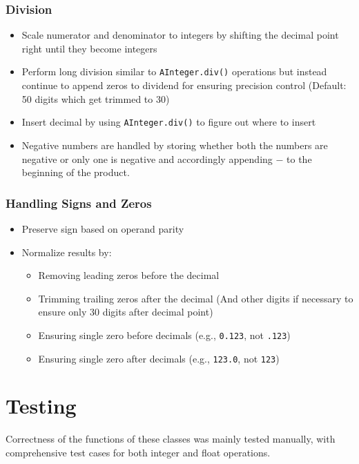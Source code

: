 \documentclass[12pt]{article}
\begin{document}
\subsubsection{Division}
\begin{itemize}
    \item Scale numerator and denominator to integers by shifting the decimal point right until they become integers
    \item Perform long division similar to \texttt{AInteger.div()} operations but instead continue to append zeros to dividend for ensuring precision control (Default: 50 digits which get trimmed to 30)
    \item Insert decimal by using \texttt{AInteger.div()} to figure out where to insert
    \item Negative numbers are handled by storing whether both the numbers are negative or only one is negative and accordingly appending $-$ to the beginning of the product.
\end{itemize}

\subsubsection{Handling Signs and Zeros}
\begin{itemize}
    \item Preserve sign based on operand parity
    \item Normalize results by:
    \begin{itemize}
        \item Removing leading zeros before the decimal
        \item Trimming trailing zeros after the decimal (And other digits if necessary to ensure only 30 digits after decimal point)
        \item Ensuring single zero before decimals (e.g., \texttt{0.123}, not \texttt{.123})
        \item Ensuring single zero after decimals (e.g., \texttt{123.0}, not \texttt{123})
    \end{itemize}
\end{itemize}

\section{Testing}

Correctness of the functions of these classes was mainly tested manually, with comprehensive test cases for both integer and float operations.
\end{document}
